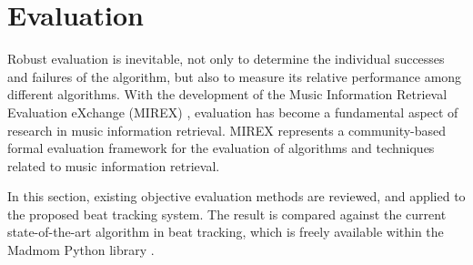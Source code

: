\documentclass{scrartcl}
\begin{document}



\newpage
\section{Evaluation}
\label{sec:evaluation}

Robust evaluation is inevitable, not only to determine the individual successes and failures of the algorithm, but also to measure its relative performance among different algorithms. With the development of the Music Information Retrieval Evaluation eXchange (MIREX) \cite{Downie2008}, evaluation has become a fundamental aspect of research in music information retrieval. MIREX represents a community-based formal evaluation framework for the evaluation of algorithms and techniques related to music information retrieval.  

In this section, existing objective evaluation methods are reviewed, and applied to the proposed beat tracking system. The result is compared against the current state-of-the-art algorithm in beat tracking, which is freely available within the Madmom Python library \cite{Boeck2016}.




\end{document}
